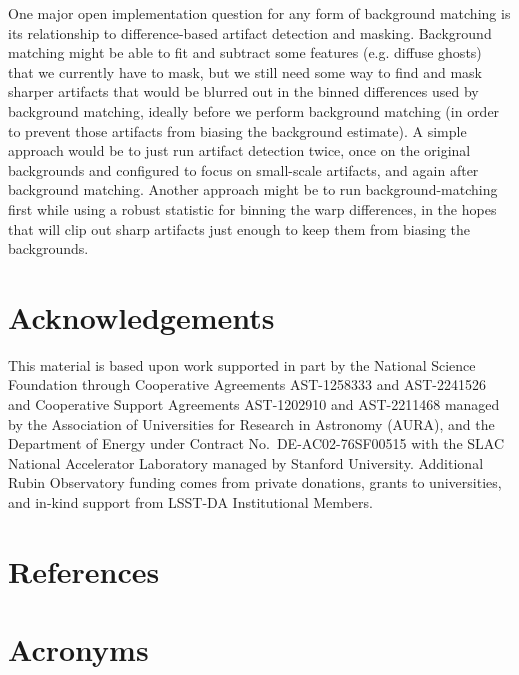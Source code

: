 \documentclass[DM,lsstdraft,authoryear,toc]{lsstdoc}
\begin{document}
One major open implementation question for any form of background matching is its relationship to difference-based artifact detection and masking.
Background matching might be able to fit and subtract some features (e.g. diffuse ghosts) that we currently have to mask, but we still need some way to find and mask sharper artifacts that would be blurred out in the binned differences used by background matching, ideally before we perform background matching (in order to prevent those artifacts from biasing the background estimate).
A simple approach would be to just run artifact detection twice, once on the original backgrounds and configured to focus on small-scale artifacts, and again after background matching.
Another approach might be to run background-matching first while using a robust statistic for binning the warp differences, in the hopes that will clip out sharp artifacts just enough to keep them from biasing the backgrounds.

\appendix

\section{Acknowledgements}

This material is based upon work supported in part by the National Science Foundation through Cooperative Agreements AST-1258333 and AST-2241526 and Cooperative Support Agreements AST-1202910 and AST-2211468 managed by the Association of Universities for Research in Astronomy (AURA), and the Department of Energy under Contract No.\ DE-AC02-76SF00515 with the SLAC National Accelerator Laboratory managed by Stanford University.
Additional Rubin Observatory funding comes from private donations, grants to universities, and in-kind support from LSST-DA Institutional Members.

\section{References} \label{sec:bib}
\renewcommand{\refname}{} %


\section{Acronyms} \label{sec:acronyms}

\end{document}
